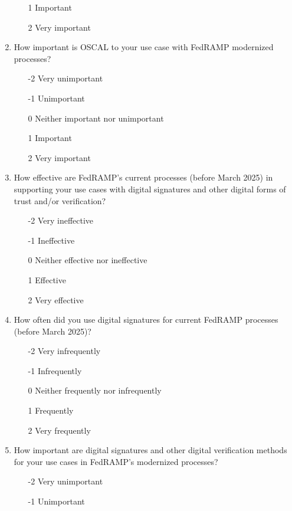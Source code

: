 \documentclass{jdf}
\begin{document}
\begin{enumerate}
\begin{enumerate}
        \item  [1] Important
        \item  [2] Very important
    \end{enumerate}
    \item How important is OSCAL to your use case with FedRAMP modernized processes?
    \begin{enumerate}
        \item [-2] Very unimportant
        \item [-1] Unimportant
        \item  [0] Neither important nor unimportant
        \item  [1] Important
        \item  [2] Very important
    \end{enumerate}
    \item How effective are FedRAMP's current processes (before March 2025) in supporting your use cases with digital signatures and other digital forms of trust and/or verification?
    \begin{enumerate}
        \item [-2] Very ineffective
        \item [-1] Ineffective
        \item  [0] Neither effective nor ineffective
        \item  [1] Effective 
        \item  [2] Very effective
    \end{enumerate}
    \item How often did you use digital signatures for current FedRAMP processes (before March 2025)?
    \begin{enumerate}
        \item [-2] Very infrequently
        \item [-1] Infrequently
        \item  [0] Neither frequently nor infrequently
        \item  [1] Frequently 
        \item  [2] Very frequently
    \end{enumerate}
    \item How important are digital signatures and other digital verification methods for your use cases in FedRAMP's modernized processes?
    \begin{enumerate}
        \item [-2] Very unimportant
        \item [-1] Unimportant

\end{enumerate}
\end{enumerate}
\end{document}
